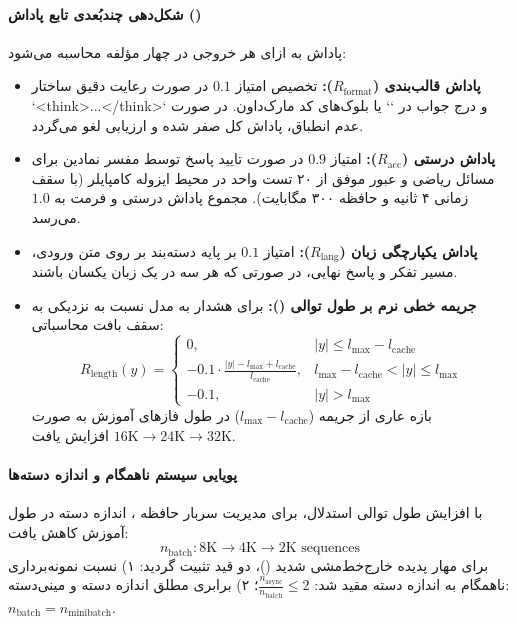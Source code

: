 \paragraph*{شکل‌دهی چندبُعدی تابع پاداش ()}
پاداش به ازای هر خروجی در چهار مؤلفه محاسبه می‌شود:
\begin{itemize}
    \item \textbf{پاداش قالب‌بندی ($R_{\text{format}}$):} تخصیص امتیاز $0.1$ در صورت رعایت دقیق ساختار `<think>...</think>` و درج جواب در `\boxed{}` یا بلوک‌های کد مارک‌داون. در صورت عدم انطباق، پاداش کل صفر شده و ارزیابی لغو می‌گردد.
    \item \textbf{پاداش درستی ($R_{\text{acc}}$):} امتیاز $0.9$ در صورت تایید پاسخ توسط مفسر نمادین  برای مسائل ریاضی و عبور موفق از ۲۰ تست واحد در محیط ایزوله کامپایلر  (با سقف زمانی ۴ ثانیه و حافظه ۳۰۰ مگابایت). مجموع پاداش درستی و فرمت به $1.0$ می‌رسد.
    \item \textbf{پاداش یکپارچگی زبان ($R_{\text{lang}}$):} امتیاز $0.1$ بر پایه دسته‌بند  بر روی متن ورودی، مسیر تفکر و پاسخ نهایی، در صورتی که هر سه در یک زبان یکسان باشند.
    \item \textbf{جریمه خطی نرم بر طول توالی ():} برای هشدار به مدل نسبت به نزدیکی به سقف بافت محاسباتی:
    \begin{equation}
        R_{\text{length}}(y) = \begin{cases} 
            0, & |y| \le l_{\max} - l_{\text{cache}} \\ 
            -0.1 \cdot \frac{|y| - l_{\max} + l_{\text{cache}}}{l_{\text{cache}}}, & l_{\max} - l_{\text{cache}} < |y| \le l_{\max} \\ 
            -0.1, & |y| > l_{\max} 
        \end{cases}
    \end{equation}
    بازه عاری از جریمه ($l_{\max} - l_{\text{cache}}$) در طول فازهای آموزش به صورت $16\text{K} \to 24\text{K} \to 32\text{K}$ افزایش یافت.
\end{itemize}

\paragraph*{پویایی سیستم ناهمگام و اندازه دسته‌ها}
با افزایش طول توالی استدلال، برای مدیریت سربار حافظه ، اندازه دسته در طول آموزش کاهش یافت:
\begin{equation}
    n_{\text{batch}}: 8\text{K} \to 4\text{K} \to 2\text{K} \text{ sequences}
\end{equation}
برای مهار پدیده خارج‌خط‌مشی شدید ()، دو قید تثبیت گردید: ۱) نسبت نمونه‌برداری ناهمگام به اندازه دسته مقید شد: $\frac{n_{\text{async}}}{n_{\text{batch}}} \le 2$؛ ۲) برابری مطلق اندازه دسته و مینی‌دسته: $n_{\text{batch}} = n_{\text{minibatch}}$.

